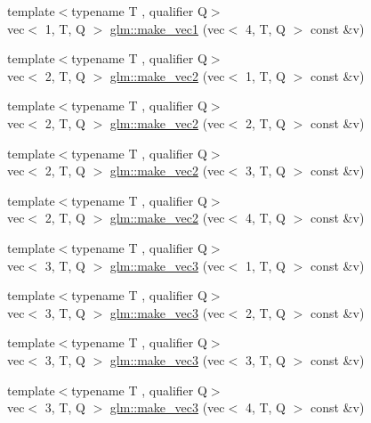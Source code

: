 \begin{DoxyCompactItemize}
\item 
{\footnotesize template$<$typename T , qualifier Q$>$ }\\vec$<$ 1, T, Q $>$ \hyperlink{group__gtc__type__ptr_ga6af06bb60d64ca8bcd169e3c93bc2419}{glm\+::make\+\_\+vec1} (vec$<$ 4, T, Q $>$ const \&v)
\item 
{\footnotesize template$<$typename T , qualifier Q$>$ }\\vec$<$ 2, T, Q $>$ \hyperlink{group__gtc__type__ptr_ga8476d0e6f1b9b4a6193cc25f59d8a896}{glm\+::make\+\_\+vec2} (vec$<$ 1, T, Q $>$ const \&v)
\item 
{\footnotesize template$<$typename T , qualifier Q$>$ }\\vec$<$ 2, T, Q $>$ \hyperlink{group__gtc__type__ptr_gae54bd325a08ad26edf63929201adebc7}{glm\+::make\+\_\+vec2} (vec$<$ 2, T, Q $>$ const \&v)
\item 
{\footnotesize template$<$typename T , qualifier Q$>$ }\\vec$<$ 2, T, Q $>$ \hyperlink{group__gtc__type__ptr_ga0084fea4694cf47276e9cccbe7b1015a}{glm\+::make\+\_\+vec2} (vec$<$ 3, T, Q $>$ const \&v)
\item 
{\footnotesize template$<$typename T , qualifier Q$>$ }\\vec$<$ 2, T, Q $>$ \hyperlink{group__gtc__type__ptr_ga2b81f71f3a222fe5bba81e3983751249}{glm\+::make\+\_\+vec2} (vec$<$ 4, T, Q $>$ const \&v)
\item 
{\footnotesize template$<$typename T , qualifier Q$>$ }\\vec$<$ 3, T, Q $>$ \hyperlink{group__gtc__type__ptr_ga9147e4b3a5d0f4772edfbfd179d7ea0b}{glm\+::make\+\_\+vec3} (vec$<$ 1, T, Q $>$ const \&v)
\item 
{\footnotesize template$<$typename T , qualifier Q$>$ }\\vec$<$ 3, T, Q $>$ \hyperlink{group__gtc__type__ptr_ga482b60a842a5b154d3eed392417a9511}{glm\+::make\+\_\+vec3} (vec$<$ 2, T, Q $>$ const \&v)
\item 
{\footnotesize template$<$typename T , qualifier Q$>$ }\\vec$<$ 3, T, Q $>$ \hyperlink{group__gtc__type__ptr_gacd57046034df557b8b1c457f58613623}{glm\+::make\+\_\+vec3} (vec$<$ 3, T, Q $>$ const \&v)
\item 
{\footnotesize template$<$typename T , qualifier Q$>$ }\\vec$<$ 3, T, Q $>$ \hyperlink{group__gtc__type__ptr_ga8b589ed7d41a298b516d2a69169248f1}{glm\+::make\+\_\+vec3} (vec$<$ 4, T, Q $>$ const \&v)
\item 

\end{DoxyCompactItemize}
